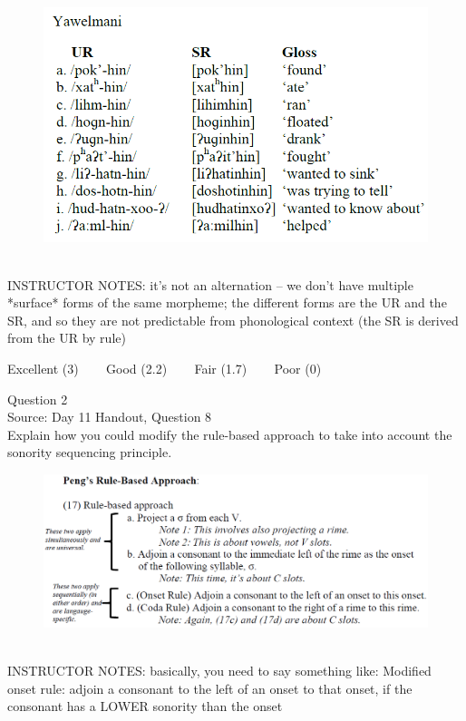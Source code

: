 \documentclass[12pt]{article}
\begin{document}
\begin{figure}[H]
\includegraphics{../images/yawelmani.png}
\end{figure}

~\\
INSTRUCTOR NOTES: it's not an alternation -- we don't have multiple *surface* forms of the same morpheme; the different forms are the UR and the SR, and so they are not predictable from phonological context (the SR is derived from the UR by rule)


\vfill
Excellent (3) ~~~ Good (2.2) ~~~ Fair (1.7) ~~~ Poor (0)
\newpage

{\large Question 2}\\

Source: Day 11 Handout, Question 8\\

Explain how you could modify the rule-based approach to take into account the sonority sequencing principle.\\

\begin{figure}[H]
\includegraphics{../images/peng_rules.png}
\end{figure}

~\\
INSTRUCTOR NOTES: basically, you need to say something like: Modified onset rule: adjoin a consonant to the left of an onset to that onset, if the consonant has a LOWER sonority than the onset
\end{document}
